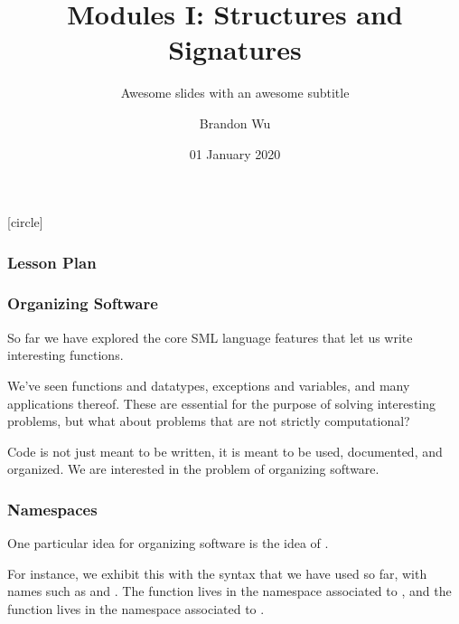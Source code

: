 \documentclass[aspectratio=169]{beamer}
\title{Modules I: Structures and Signatures} %
\subtitle{Awesome slides with an awesome subtitle} %
\date{01 January 2020} %
\author{Brandon Wu} %
\newif\ifcolorlambda
\begin{document}
\ifweb
    \renewcommand{\pause}{}
\fi

[circle]

{
\begin{frame}[plain]
    \colorlambdatrue
    \titlepage
\end{frame}
}

\begin{frame}[fragile]
  \frametitle{Lesson Plan}

  \tableofcontents
\end{frame}


\begin{frame}[fragile]
  \frametitle{Organizing Software}

  So far we have explored the core SML language features that let us write
  interesting functions.

  \vspace{\fill}

  We've seen functions and datatypes, exceptions and variables, and many
  applications thereof. These are essential for the purpose of solving interesting
  problems, but what about problems that are not strictly computational?

  \vspace{\fill}

  Code is not just meant to be written, it is meant to be used,
  documented, and organized. We are interested in the problem of organizing software.
\end{frame}

\begin{frame}[fragile]
  \frametitle{Namespaces}

  One particular idea for organizing software is the idea of .

  \vspace{\fill}

  
  \vspace{\fill}

  For instance, we exhibit this with the syntax that we have used so far, with
  names such as  and . The 
  function lives in the namespace associated to , and the 
  function lives in the namespace associated to .

  \vspace{\fill}

\end{frame}
\end{document}
